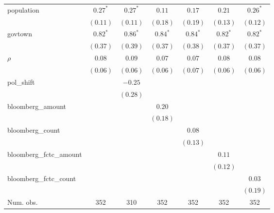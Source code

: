 \begin{table}[!h]
\begin{center}
\begin{tabular}{l c c c c c c }
population              & $0.27^{*}$   & $0.27^{*}$   & $0.11$       & $0.17$       & $0.21$       & $0.26^{*}$   \\
                        & $(0.11)$     & $(0.11)$     & $(0.18)$     & $(0.19)$     & $(0.13)$     & $(0.12)$     \\
govtown                 & $0.82^{*}$   & $0.86^{*}$   & $0.84^{*}$   & $0.84^{*}$   & $0.82^{*}$   & $0.82^{*}$   \\
                        & $(0.37)$     & $(0.39)$     & $(0.37)$     & $(0.38)$     & $(0.37)$     & $(0.37)$     \\
$\rho$                  & $0.08$       & $0.09$       & $0.07$       & $0.07$       & $0.08$       & $0.08$       \\
                        & $(0.06)$     & $(0.06)$     & $(0.06)$     & $(0.07)$     & $(0.06)$     & $(0.06)$     \\
pol\_shift              &              & $-0.25$      &              &              &              &              \\
                        &              & $(0.28)$     &              &              &              &              \\
bloomberg\_amount       &              &              & $0.20$       &              &              &              \\
                        &              &              & $(0.18)$     &              &              &              \\
bloomberg\_count        &              &              &              & $0.08$       &              &              \\
                        &              &              &              & $(0.13)$     &              &              \\
bloomberg\_fctc\_amount &              &              &              &              & $0.11$       &              \\
                        &              &              &              &              & $(0.12)$     &              \\
bloomberg\_fctc\_count  &              &              &              &              &              & $0.03$       \\
                        &              &              &              &              &              & $(0.19)$     \\
\midrule
Num. obs.               & 352          & 310          & 352          & 352          & 352          & 352          \\

\end{tabular}
\end{center}
\end{table}
